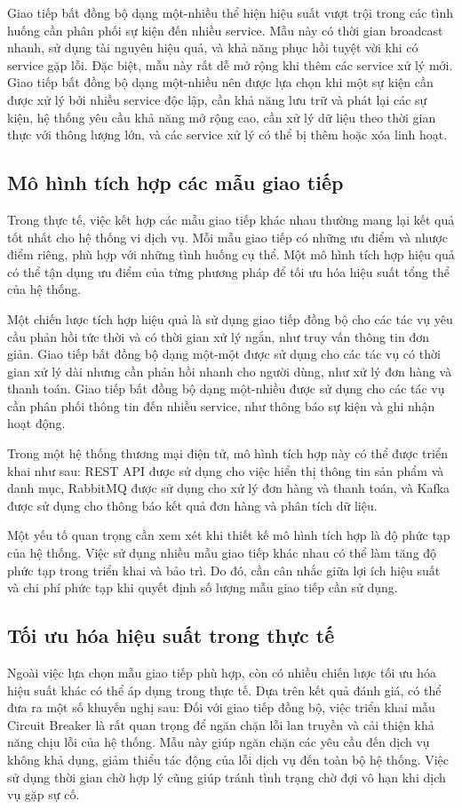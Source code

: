 Giao tiếp bất đồng bộ dạng một-nhiều thể hiện hiệu suất vượt trội trong các tình huống cần phân phối sự kiện đến nhiều service. Mẫu này có thời gian broadcast nhanh, sử dụng tài nguyên hiệu quả, và khả năng phục hồi tuyệt vời khi có service gặp lỗi. Đặc biệt, mẫu này rất dễ mở rộng khi thêm các service xử lý mới. Giao tiếp bất đồng bộ dạng một-nhiều nên được lựa chọn khi một sự kiện cần được xử lý bởi nhiều service độc lập, cần khả năng lưu trữ và phát lại các sự kiện, hệ thống yêu cầu khả năng mở rộng cao, cần xử lý dữ liệu theo thời gian thực với thông lượng lớn, và các service xử lý có thể bị thêm hoặc xóa linh hoạt.

\subsection{Mô hình tích hợp các mẫu giao tiếp}
Trong thực tế, việc kết hợp các mẫu giao tiếp khác nhau thường mang lại kết quả tốt nhất cho hệ thống vi dịch vụ. Mỗi mẫu giao tiếp có những ưu điểm và nhược điểm riêng, phù hợp với những tình huống cụ thể. Một mô hình tích hợp hiệu quả có thể tận dụng ưu điểm của từng phương pháp để tối ưu hóa hiệu suất tổng thể của hệ thống.

Một chiến lược tích hợp hiệu quả là sử dụng giao tiếp đồng bộ cho các tác vụ yêu cầu phản hồi tức thời và có thời gian xử lý ngắn, như truy vấn thông tin đơn giản. Giao tiếp bất đồng bộ dạng một-một được sử dụng cho các tác vụ có thời gian xử lý dài nhưng cần phản hồi nhanh cho người dùng, như xử lý đơn hàng và thanh toán. Giao tiếp bất đồng bộ dạng một-nhiều được sử dụng cho các tác vụ cần phân phối thông tin đến nhiều service, như thông báo sự kiện và ghi nhận hoạt động.

Trong một hệ thống thương mại điện tử, mô hình tích hợp này có thể được triển khai như sau: REST API được sử dụng cho việc hiển thị thông tin sản phẩm và danh mục, RabbitMQ được sử dụng cho xử lý đơn hàng và thanh toán, và Kafka được sử dụng cho thông báo kết quả đơn hàng và phân tích dữ liệu.

Một yếu tố quan trọng cần xem xét khi thiết kế mô hình tích hợp là độ phức tạp của hệ thống. Việc sử dụng nhiều mẫu giao tiếp khác nhau có thể làm tăng độ phức tạp trong triển khai và bảo trì. Do đó, cần cân nhắc giữa lợi ích hiệu suất và chi phí phức tạp khi quyết định số lượng mẫu giao tiếp cần sử dụng.

\subsection{Tối ưu hóa hiệu suất trong thực tế}
Ngoài việc lựa chọn mẫu giao tiếp phù hợp, còn có nhiều chiến lược tối ưu hóa hiệu suất khác có thể áp dụng trong thực tế. Dựa trên kết quả đánh giá, có thể đưa ra một số khuyến nghị sau:
Đối với giao tiếp đồng bộ, việc triển khai mẫu Circuit Breaker là rất quan trọng để ngăn chặn lỗi lan truyền và cải thiện khả năng chịu lỗi của hệ thống. Mẫu này giúp ngăn chặn các yêu cầu đến dịch vụ không khả dụng, giảm thiểu tác động của lỗi dịch vụ đến toàn bộ hệ thống. Việc sử dụng thời gian chờ hợp lý cũng giúp tránh tình trạng chờ đợi vô hạn khi dịch vụ gặp sự cố.

